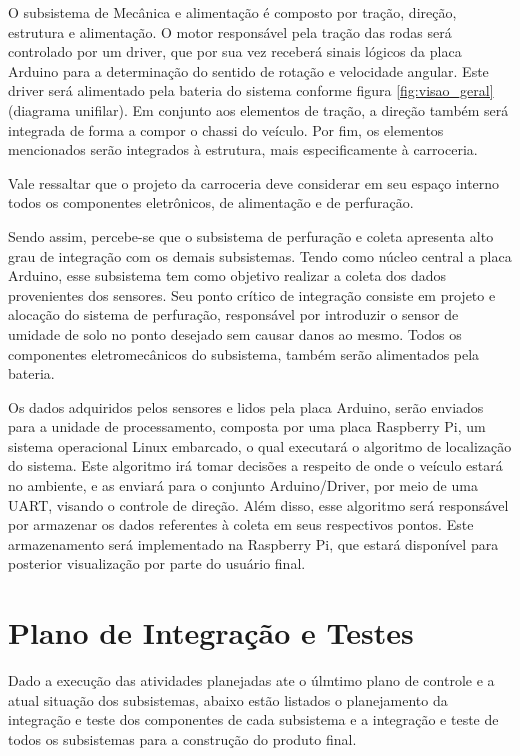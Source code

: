 
O subsistema de Mecânica e alimentação é composto por tração, direção, estrutura e alimentação. O motor
responsável pela tração das rodas será controlado por um driver, que por sua vez receberá sinais lógicos da placa Arduino
para a determinação do sentido de rotação e velocidade angular. Este driver será alimentado pela bateria do sistema conforme
figura \ref{fig:visao_geral} (diagrama unifilar). Em conjunto aos elementos de tração, a direção também será integrada de forma
a compor o chassi do veículo. Por fim, os elementos mencionados serão integrados à estrutura, mais especificamente à carroceria.

Vale ressaltar que o projeto da carroceria deve considerar em seu espaço interno todos os componentes eletrônicos, de
alimentação e de perfuração. 

Sendo assim, percebe-se que o subsistema de perfuração e coleta apresenta alto grau de integração com os demais subsistemas.
Tendo como núcleo central a placa Arduino, esse subsistema tem como objetivo realizar a coleta dos dados provenientes dos
sensores. Seu ponto crítico de integração consiste em projeto e alocação do sistema de perfuração, responsável por introduzir
o sensor de umidade de solo no ponto desejado sem causar danos ao mesmo. Todos os componentes eletromecânicos do subsistema,
também serão alimentados pela bateria.


Os dados adquiridos pelos sensores e lidos pela placa Arduino, serão enviados para a unidade de processamento, composta por
uma placa Raspberry Pi, um sistema operacional Linux embarcado, o qual executará o algoritmo de localização do sistema. Este
algoritmo irá tomar decisões a respeito de onde o veículo estará no ambiente, e as enviará para o conjunto Arduino/Driver, por meio de uma UART, visando o controle de
direção. Além disso, esse algoritmo será responsável por armazenar os dados referentes à coleta em seus respectivos
pontos. Este armazenamento será implementado na Raspberry Pi, que estará disponível para posterior visualização por
parte do usuário final.

\chapter{Plano de Integração e Testes}

Dado a execução das atividades planejadas ate o úlmtimo plano de controle e a atual situação dos subsistemas, abaixo estão listados o planejamento da integração e teste dos componentes de cada subsistema e a integração e teste de todos os subsistemas para a construção do produto final.

